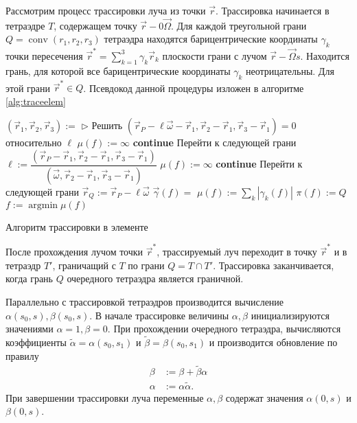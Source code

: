 Рассмотрим процесс трассировки луча из точки $\vec r$. Трассировка начинается в тетраэдре $T$, содержащем точку $\vec r - 0 \vec \Omega$. Для каждой треугольной грани $Q = \operatorname{conv}(r_1, r_2, r_3)$ тетраэдра находятся барицентрические координаты $\gamma_k$ точки пересечения $\vec r^* = \sum_{k=1}^3 \gamma_k \vec r_k$ плоскости грани с лучом $\vec r - \vec \Omega s$.  Находится грань, для которой все барицентрические координаты $\gamma_k$ неотрицательны. Для этой грани $\vec r^* \in Q$. Псевдокод данной процедуры изложен в алгоритме \ref{alg:traceelem}  
\begin{algorithm}[ht!]
\centering
\begin{algorithmic}[1]
\State $(\vec r_1, \vec r_2, \vec r_3) := $ 
\State $\triangleright$  Решить
$(
\vec r_P - \ell \vec \omega - \vec r_1,
\vec r_2 - \vec r_1,
\vec r_3 - \vec r_1
) = 0$ относительно $\ell$
\State $\mu(f) := \infty$
\State \textbf{continue} \Comment Перейти к следующей грани
\EndIf
\State $\ell := 
\dfrac{(\vec r_P - \vec r_1, \vec r_2 - \vec r_1, \vec r_3 - \vec r_1)}
{(\vec \omega, \vec r_2 - \vec r_1, \vec r_3 - \vec r_1)}$
\State $\mu(f) := \infty$
\State \textbf{continue} \Comment Перейти к следующей грани
\EndIf
\State $\vec r_Q := \vec r_P - \ell \vec \omega$
\State $\vec\gamma(f) = $ 
\State $\mu(f) := \sum_{k}|\gamma_k(f)|$
\State $\pi(f) := Q$
\EndFor
\State $f := \operatorname{argmin} \mu(f)$
\State{}
\EndFunction
\end{algorithmic}
\caption{Алгоритм трассировки в элементе}
\label{alg:traceelem}
\end{algorithm}

После прохождения лучом точки $\vec r^*$, трассируемый луч переходит в точку $\vec r^*$ и в тетраэдр $T'$, граничащий с $T$ по грани $Q = T \cap T'$.  Трассировка заканчивается, когда грань $Q$ очередного тетраэдра является граничной.

Параллельно с трассировкой тетраэдров производится вычисление $\alpha(s_0, s), \beta(s_0, s)$. В начале трассировке величины $\alpha, \beta$ инициализируются значениями $\alpha = 1, \beta = 0$.
При прохождении очередного тетраэдра, вычисляются коэффициенты $\tilde \alpha = \alpha(s_0, s_1)$ и $\tilde \beta = \beta(s_0, s_1)$ и производится обновление по правилу
\[\begin{aligned}
\beta &:= \beta + \tilde \beta \alpha\\
\alpha &:= \alpha \tilde \alpha.
\end{aligned}
\]
При завершении трассировки луча переменные $\alpha, \beta$ содержат значения $\alpha(0, s)$ и $\beta(0, s)$.

